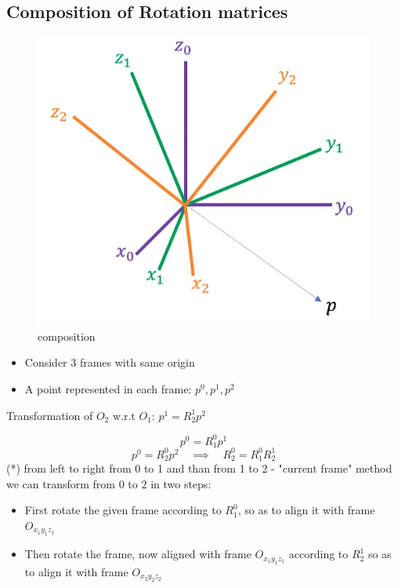 \documentclass{article}
\begin{document}
\newpage
\subsection{Composition of Rotation matrices}
\begin{figure}[h!]
\centering
\includegraphics[scale=1.5]{compR.png}
\caption{composition}
\label{fig:sr}
\end{figure}
\begin{itemize}
    \item Consider 3 frames with same origin
    \item A point represented in each frame: $p^{0},p^{1},p^{2}$
\end{itemize}
Transformation of $O_{2}$ w.r.t $ O_{1}$: $p^{1} = R^{1}_{2}p^{2}$

$$ p^{0} = R^{0}_{1}p^{1}$$
$$ p^{0} = R^{0}_{2}p^{2} \quad \implies \quad R^{0}_{2}=R^{0}_{1}R^{1}_{2} $$
(*) from left to right from 0 to 1 and than from 1 to 2 - "current frame" method\\

we can transform from $0$ to $2$ in two steps:
\begin{itemize}

    \item First rotate the given frame according to $R^{0}_{1}$, so as to align it with frame $O_{x_{1}y_{1}z_{1}}$
    \item Then rotate the frame, now aligned with frame $O_{x_{1}y_{1}z_{1}}$ according to $R^{1}_{2}$ so as to align it with frame $O_{x_{2}y_{2}z_{2}}$
\end{itemize}
\end{document}

